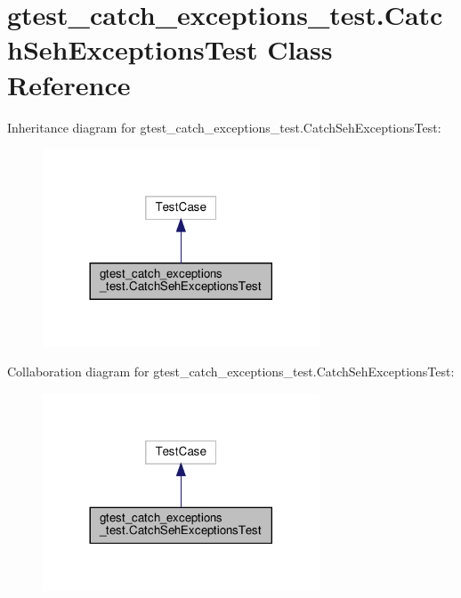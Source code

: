 \hypertarget{classgtest__catch__exceptions__test_1_1_catch_seh_exceptions_test}{}\section{gtest\+\_\+catch\+\_\+exceptions\+\_\+test.\+Catch\+Seh\+Exceptions\+Test Class Reference}
\label{classgtest__catch__exceptions__test_1_1_catch_seh_exceptions_test}


Inheritance diagram for gtest\+\_\+catch\+\_\+exceptions\+\_\+test.\+Catch\+Seh\+Exceptions\+Test\+:
\nopagebreak
\begin{figure}[H]
\begin{center}
\leavevmode
\includegraphics[width=233pt]{classgtest__catch__exceptions__test_1_1_catch_seh_exceptions_test__inherit__graph}
\end{center}
\end{figure}


Collaboration diagram for gtest\+\_\+catch\+\_\+exceptions\+\_\+test.\+Catch\+Seh\+Exceptions\+Test\+:
\nopagebreak
\begin{figure}[H]
\begin{center}
\leavevmode
\includegraphics[width=233pt]{classgtest__catch__exceptions__test_1_1_catch_seh_exceptions_test__coll__graph}
\end{center}
\end{figure}
